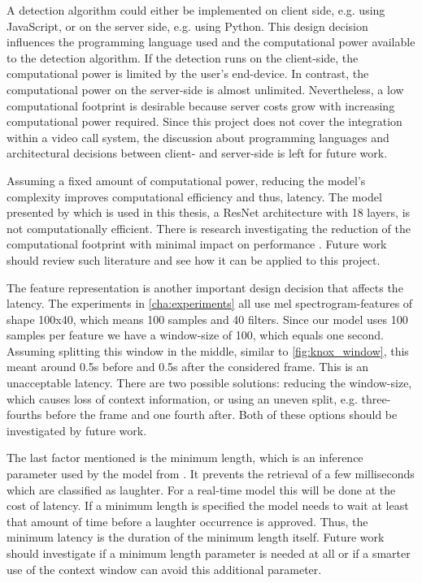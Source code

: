 \documentclass[bsc,frontabs,parskip,deptreport]{infthesis}
\begin{document}
A detection algorithm could either be implemented on client side, e.g. using JavaScript, or on the server side, e.g. using Python. 
This design decision influences the programming language used and the computational power available to the detection algorithm. If the detection runs on the client-side, the computational power is limited by the user's end-device. In contrast, the computational power on the server-side is almost unlimited. Nevertheless, a low computational footprint is desirable because server costs grow with increasing computational power required.
Since this project does not cover the integration within a video call system, the discussion about programming languages and architectural decisions between client- and server-side is left for future work.

Assuming a fixed amount of computational power, reducing the model's complexity improves computational efficiency and thus, latency.
The model presented by \citet{gillick2021robust} which is used in this thesis, a ResNet architecture with 18 layers, is not computationally efficient. There is research investigating the reduction of the computational footprint with minimal impact on performance \cite{sorensen2020depthwise}. Future work should review such literature and see how it can be applied to this project. 

The feature representation is another important design decision that affects the latency.
The experiments in \autoref{cha:experiments} all use mel spectrogram-features of shape 100x40, which means 100 samples and 40 filters. 
Since our model uses 100 samples per feature we have a window-size of 100, which equals one second.
Assuming splitting this window in the middle, similar to \autoref{fig:knox_window}, this meant around 0.5s before and 0.5s after the considered frame. This is an unacceptable latency.
There are two possible solutions: reducing the window-size, which causes loss of context information, or using an uneven split, e.g. three-fourths before the frame and one fourth after. 
Both of these options should be investigated by future work.

The last factor mentioned is the minimum length, which is an inference parameter used by the model from \citet{gillick2021robust}. It prevents the retrieval of a few milliseconds which are classified as laughter. For a real-time model this will be done at the cost of latency. If a minimum length is specified the model needs to wait at least that amount of time before a laughter occurrence is approved. Thus, the minimum latency is the duration of the minimum length itself.
Future work should investigate if a minimum length parameter is needed at all or if a smarter use of the context window can avoid this additional parameter.
\end{document}
